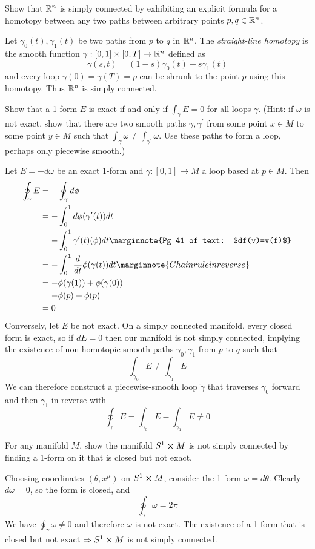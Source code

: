 \documentclass[10pt]{article}
\begin{document}
\begin{example}\label{b1e81}
	Show that $\mathbb{R}^n$ is simply connected by exhibiting an explicit formula for a homotopy between any two paths between arbitrary points $p,q \in \mathbb{R}^n$.
\end{example}
\sol Let $\gamma_0(t), \gamma_1(t)$ be two paths from $p$ to $q$ in $\mathbb{R}^n$. The \emph{straight-line homotopy} is the smooth function $\gamma:[0,1]\times[0,T]\to \mathbb{R}^n$ defined as
$$
\gamma(s,t) = (1-s)\gamma_0(t)+s\gamma_1(t)
$$
and every loop $\gamma(0)=\gamma(T)=p$ can be shrunk to the point $p$ using this homotopy. Thus $\mathbb{R}^n$ is simply connected.


\begin{example}
	Show that a 1-form $E$ is exact if and only if $\int_\gamma E = 0$ for all loops $\gamma$. (Hint: if $\omega$ is not exact, show that there are two smooth paths $\gamma,\gamma^\prime$ from some point $x \in M$ to some point $y \in M$ such that $\int_\gamma \omega\ne\int_{\gamma^\prime} \omega$. Use these paths to form a loop, perhaps only piecewise smooth.)
\end{example}
\sol Let $E=-d\omega$ be an exact 1-form and $\gamma:[0,1]\to M$ a loop based at $p \in M$. Then
$$
\begin{aligned}
	\oint_\gamma E &= -\oint_\gamma d\phi\\
	&= -\int_{0}^{1} d\phi(\gamma^\prime(t)) dt\\
	&= -\int_{0}^{1} \gamma^\prime(t)(\phi) dt\marginnote{Pg 41 of text: $df(v)=v(f)$}\\
	&= -\int_{0}^{1} \frac{d}{dt}\phi(\gamma(t))dt\marginnote{Chain rule in reverse}\\
	&= -\phi(\gamma(1))+\phi(\gamma(0))\\
	&= -\phi(p)+\phi(p)\\
	&= 0
\end{aligned}
$$
Conversely, let $E$ be not exact. On a simply connected manifold, every closed form is exact, so if $dE=0$ then our manifold is not simply connected, implying the existence of non-homotopic smooth paths $\gamma_0, \gamma_1$ from $p$ to $q$ such that
$$
\int_{\gamma_0} E \ne \int_{\gamma_1} E
$$
We can therefore construct a piecewise-smooth loop $\tilde{\gamma}$ that traverses $\gamma_0$ forward and then $\gamma_1$ in reverse with
$$
\oint_{\tilde{\gamma}} E = \int_{\gamma_0} E - \int_{\gamma_1} E \ne 0
$$


\begin{example}\label{b1e83}
	For any manifold $M$, show the manifold $S^1 \cross M$ is not simply connected by finding a 1-form on it that is closed but not exact.
\end{example}
\sol Choosing coordinates $(\theta, x^\mu)$ on $S^1\cross M$, consider the 1-form $\omega=d\theta$. Clearly $d\omega=0$, so the form is closed, and
$$
\oint_\gamma \omega = 2\pi
$$
We have $\oint_\gamma \omega \ne 0$ and therefore $\omega$ is not exact. 
The existence of a 1-form that is closed but not exact $\Rightarrow S^1 \cross M$ is not simply connected.
\end{document}
